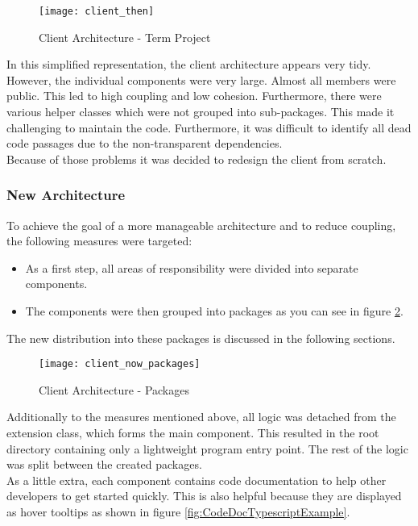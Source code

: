 \begin{figure}[H]
    \centering
    \texttt{[image: client\_then]}
    \caption{Client Architecture - Term Project}
    \label{fig:client_then}
\end{figure}

In this simplified representation, the client architecture appears very tidy.
However, the individual components were very large.
Almost all members were public.
This led to high coupling and low cohesion.
Furthermore, there were various helper classes which were not grouped into sub-packages.
This made it challenging to maintain the code.
Furthermore, it was difficult to identify all dead code passages due to the non-transparent dependencies.\\

Because of those problems it was decided to redesign the client from scratch.

\subsubsection{New Architecture}
To achieve the goal of a more manageable architecture and to reduce coupling, the following measures were targeted:
\begin{itemize}
    \item As a first step, all areas of responsibility were divided into separate components.
    \item The components were then grouped into packages as you can see in figure \ref{fig:client_now_packages}.
\end{itemize}
The new distribution into these packages is discussed in the following sections.\\

\begin{figure}[H]
    \centering
    \texttt{[image: client\_now\_packages]}
    \caption{Client Architecture - Packages}
    \label{fig:client_now_packages}
\end{figure}

Additionally to the measures mentioned above, all logic was detached from the extension class, which forms the main component.
This resulted in the root directory containing only a lightweight program entry point.
The rest of the logic was split between the created packages.\\

As a little extra, each component contains code documentation to help other developers to get started quickly.
This is also helpful because they are displayed as hover tooltips as shown in figure \ref{fig:CodeDocTypescriptExample}.

